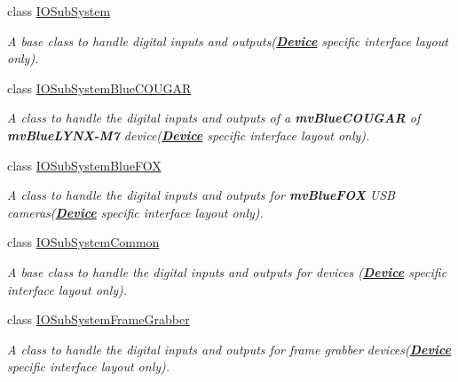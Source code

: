 \begin{DoxyCompactItemize}
class \hyperlink{classmv_i_m_p_a_c_t_1_1acquire_1_1_i_o_sub_system}{I\+O\+Sub\+System}
\begin{DoxyCompactList}\small\item\em A base class to handle digital inputs and outputs({\bfseries \hyperlink{classmv_i_m_p_a_c_t_1_1acquire_1_1_device}{Device}} specific interface layout only). \end{DoxyCompactList}\item 
class \hyperlink{classmv_i_m_p_a_c_t_1_1acquire_1_1_i_o_sub_system_blue_c_o_u_g_a_r}{I\+O\+Sub\+System\+Blue\+C\+O\+U\+G\+A\+R}
\begin{DoxyCompactList}\small\item\em A class to handle the digital inputs and outputs of a {\bfseries mv\+Blue\+C\+O\+U\+G\+A\+R} of {\bfseries mv\+Blue\+L\+Y\+N\+X-\/\+M7} device({\bfseries \hyperlink{classmv_i_m_p_a_c_t_1_1acquire_1_1_device}{Device}} specific interface layout only). \end{DoxyCompactList}\item 
class \hyperlink{classmv_i_m_p_a_c_t_1_1acquire_1_1_i_o_sub_system_blue_f_o_x}{I\+O\+Sub\+System\+Blue\+F\+O\+X}
\begin{DoxyCompactList}\small\item\em A class to handle the digital inputs and outputs for {\bfseries mv\+Blue\+F\+O\+X} U\+S\+B cameras({\bfseries \hyperlink{classmv_i_m_p_a_c_t_1_1acquire_1_1_device}{Device}} specific interface layout only). \end{DoxyCompactList}\item 
class \hyperlink{classmv_i_m_p_a_c_t_1_1acquire_1_1_i_o_sub_system_common}{I\+O\+Sub\+System\+Common}
\begin{DoxyCompactList}\small\item\em A base class to handle the digital inputs and outputs for devices ({\bfseries \hyperlink{classmv_i_m_p_a_c_t_1_1acquire_1_1_device}{Device}} specific interface layout only). \end{DoxyCompactList}\item 
class \hyperlink{classmv_i_m_p_a_c_t_1_1acquire_1_1_i_o_sub_system_frame_grabber}{I\+O\+Sub\+System\+Frame\+Grabber}
\begin{DoxyCompactList}\small\item\em A class to handle the digital inputs and outputs for frame grabber devices({\bfseries \hyperlink{classmv_i_m_p_a_c_t_1_1acquire_1_1_device}{Device}} specific interface layout only). \end{DoxyCompactList}\item 

\end{DoxyCompactItemize}

